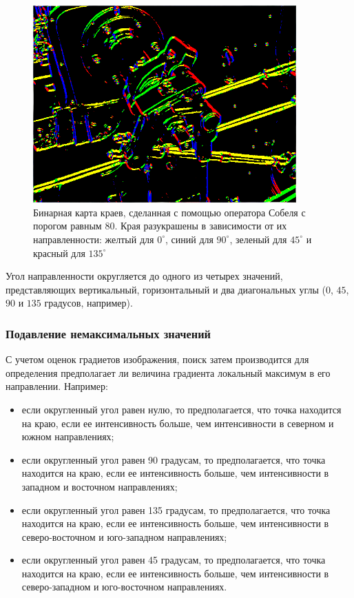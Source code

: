 \begin{figure}
  \centering
  \includegraphics[width=0.9\textwidth]{images/canny-sobel.png}
  \caption{Бинарная карта краев, сделанная с помощью оператора Собеля с порогом равным $80$. Края разукрашены в зависимости от их направленности: желтый для $0^{\circ}$, синий для $90^{\circ}$, зеленый для $45^{\circ}$ и красный для $135^{\circ}$\label{canny-sobel}}
\end{figure}

Угол направленности округляется до одного из четырех значений, представляющих вертикальный, горизонтальный и два диагональных углы ($0$, $45$, $90$ и $135$ градусов, например).

\subsubsection{Подавление немаксимальных значений}
С учетом оценок градиетов изображения, поиск затем производится для определения предполагает ли величина градиента локальный максимум в его направлении. Например:
\begin{itemize}
  \item если округленный угол равен нулю, то предполагается, что точка находится на краю, если ее интенсивность больше, чем интенсивности в северном и южном направлениях;
  \item если округленный угол равен 90 градусам, то предполагается, что точка находится на краю, если ее интенсивность больше, чем интенсивности в западном и восточном направлениях;
  \item если округленный угол равен 135 градусам, то предполагается, что точка находится на краю, если ее интенсивность больше, чем интенсивности в северо-восточном и юго-западном направлениях;
  \item если округленный угол равен 45 градусам, то предполагается, что точка находится на краю, если ее интенсивность больше, чем интенсивности в северо-западном и юго-восточном направлениях.
\end{itemize}


